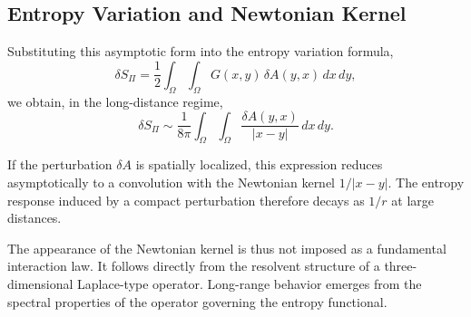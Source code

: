 \subsection{Entropy Variation and Newtonian Kernel}
  \label{subsec:entropy-variation}

  Substituting this asymptotic form into the entropy variation formula,
  \begin{equation}
    \delta S_\Pi
    = \frac12 \int_\Omega \int_\Omega
    G(x,y)\, \delta A(y,x)\, dx\, dy,
  \end{equation}
  we obtain, in the long-distance regime,
  \begin{equation}
    \delta S_\Pi
    \sim
    \frac{1}{8\pi}
    \int_\Omega \int_\Omega
    \frac{\delta A(y,x)}{|x-y|}\, dx\, dy.
  \end{equation}

  If the perturbation $\delta A$ is spatially localized,
  this expression reduces asymptotically to a convolution
  with the Newtonian kernel $1/|x-y|$.
  The entropy response induced by a compact perturbation
  therefore decays as $1/r$ at large distances.

  The appearance of the Newtonian kernel is thus not imposed
  as a fundamental interaction law.
  It follows directly from the resolvent structure of a
  three-dimensional Laplace-type operator.
  Long-range behavior emerges from the spectral properties
  of the operator governing the entropy functional.
